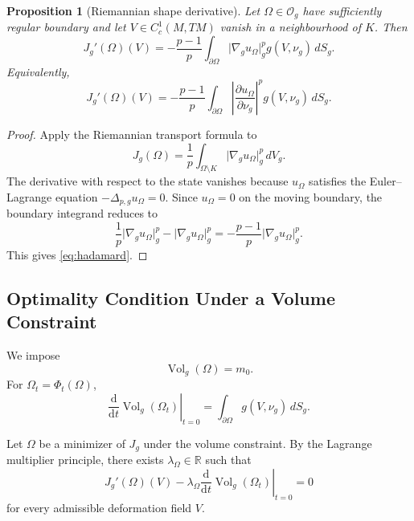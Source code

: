 \documentclass[11pt,a4paper]{article}
\newtheorem{proposition}[theorem]{Proposition}
\theoremstyle{definition}
\theoremstyle{remark}
\newcommand{\R}{\mathbb{R}}
\newcommand{\Og}{\mathcal{O}_g}
\newcommand{\Vol}{\operatorname{Vol}_g}
\newcommand{\gradg}{\nabla_g}
\newcommand{\plapg}{\Delta_{p,g}}
\newcommand{\normg}[1]{\lvert #1\rvert_g}
\newcommand{\dd}{\mathrm{d}}
\begin{document}
\begin{proposition}[Riemannian shape derivative]
\label{prop:shape-derivative}
Let $\Omega\in\Og$ have sufficiently regular boundary and let
$V\in C_c^1(M,TM)$ vanish in a neighbourhood of $K$. Then
\begin{equation}
J_g'(\Omega)(V)
=
-\frac{p-1}{p}
\int_{\partial\Omega}
\normg{\gradg u_\Omega}^{p}
g(V,\nu_g)\,dS_g.
\label{eq:hadamard}
\end{equation}
Equivalently,
\begin{equation}
J_g'(\Omega)(V)
=
-\frac{p-1}{p}
\int_{\partial\Omega}
\left|
\frac{\partial u_\Omega}{\partial\nu_g}
\right|^p
g(V,\nu_g)\,dS_g.
\label{eq:hadamard-normal}
\end{equation}
\end{proposition}

\begin{proof}
Apply the Riemannian transport formula to
\[
J_g(\Omega)
=
\frac1p
\int_{\Omega\setminus K}
\normg{\gradg u_\Omega}^{p}\,dV_g.
\]
The derivative with respect to the state vanishes because
$u_\Omega$ satisfies the Euler--Lagrange equation
$-\plapg u_\Omega=0$. Since $u_\Omega=0$ on the moving boundary,
the boundary integrand reduces to
\[
\frac1p\normg{\gradg u_\Omega}^{p}
-
\normg{\gradg u_\Omega}^{p}
=
-\frac{p-1}{p}
\normg{\gradg u_\Omega}^{p}.
\]
This gives \eqref{eq:hadamard}.
\end{proof}

\subsection{Optimality Condition Under a Volume Constraint}

We impose
\[
\Vol(\Omega)=m_0.
\]
For $\Omega_t=\Phi_t(\Omega)$,
\begin{equation}
\left.
\frac{\dd}{\dd t}\Vol(\Omega_t)
\right|_{t=0}
=
\int_{\partial\Omega}
g(V,\nu_g)\,dS_g.
\label{eq:volume-variation}
\end{equation}

Let $\Omega$ be a minimizer of $J_g$ under the volume constraint.
By the Lagrange multiplier principle, there exists
$\lambda_\Omega\in\R$ such that
\[
J_g'(\Omega)(V)
-
\lambda_\Omega
\left.
\frac{\dd}{\dd t}\Vol(\Omega_t)
\right|_{t=0}
=0
\]
for every admissible deformation field $V$.
\end{document}
